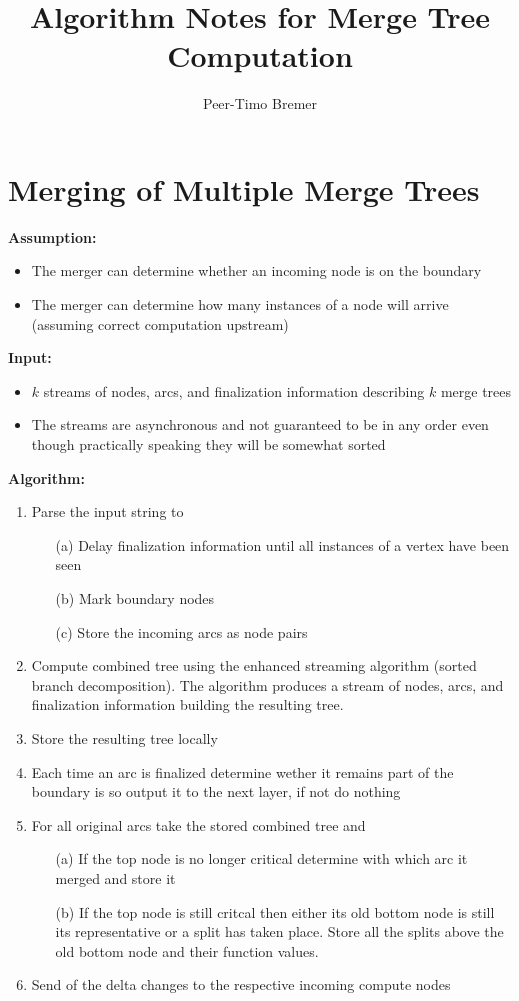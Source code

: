 \documentclass[]{article}
\title{Algorithm Notes for Merge Tree Computation}
\author{Peer-Timo Bremer}
\date{}
\begin{document}
\maketitle

\section{Merging of Multiple Merge Trees}

{\bf Assumption:}
\begin{itemize}
\item The merger can determine whether an incoming node is on the boundary
\item The merger can determine how many instances of a node will arrive
  (assuming correct computation upstream)
\end{itemize}

\noindent
{\bf Input:} 
\begin{itemize}
\item $k$ streams of nodes, arcs, and finalization information describing $k$ merge trees
\item The streams are asynchronous and not guaranteed to be in any order even
  though practically speaking they will be somewhat sorted
\end{itemize}

\noindent
{\bf Algorithm:}
\begin{enumerate}
\item Parse the input string to
  \begin{enumerate}
  \item[(a)] Delay finalization information until all instances of a vertex have
    been seen
  \item[(b)] Mark boundary nodes
    \item[(c)] Store the incoming arcs as node pairs
  \end{enumerate}
\item Compute combined tree using the enhanced streaming algorithm (sorted branch
  decomposition). The algorithm produces a stream of nodes, arcs, and
  finalization information building the resulting tree.
\item Store the resulting tree locally 
\item Each time an arc is finalized determine wether it remains part of the
  boundary is so output it to the next layer, if not do nothing
\item For all original arcs take the stored combined tree and 
  \begin{enumerate}
  \item[(a)] If the top node is no longer critical determine with which arc it merged and
    store it
  \item[(b)] If the top node is still critcal then either its old bottom node is
    still its representative or a split has taken place. Store all the splits
    above the old bottom node and their function values. 
  \end{enumerate}
\item Send of the delta changes to the respective incoming compute nodes
\end{enumerate}
\end{document}
